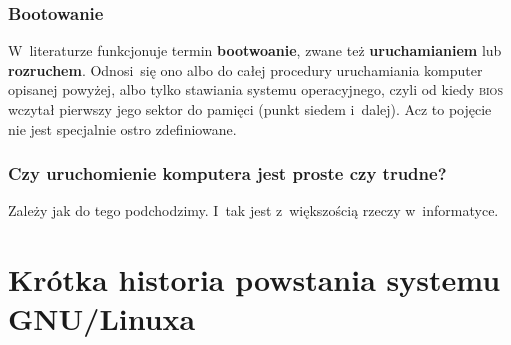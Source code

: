 \documentclass[10pt,t]{beamer}
\begin{document}
\begin{frame}
  \frametitle{Bootowanie}


  W~literaturze funkcjonuje termin \textbf{bootwoanie}, zwane też
  \textbf{uruchamianiem} lub \textbf{rozruchem}. Odnosi~się ono albo do
  całej procedury uruchamiania komputer opisanej powyżej, albo tylko
  stawiania systemu operacyjnego, czyli od kiedy \textsc{bios} wczytał
  pierwszy jego sektor do pamięci (punkt siedem i~dalej). Acz to pojęcie
  nie jest specjalnie ostro zdefiniowane.

\end{frame}





\begin{frame}
  \frametitle{Czy uruchomienie komputera jest proste czy trudne?}


  Zależy jak do tego podchodzimy. I~tak jest z~większością rzeczy
  w~informatyce.

\end{frame}










\section{Krótka historia powstania systemu GNU/Linuxa}
\end{document}
